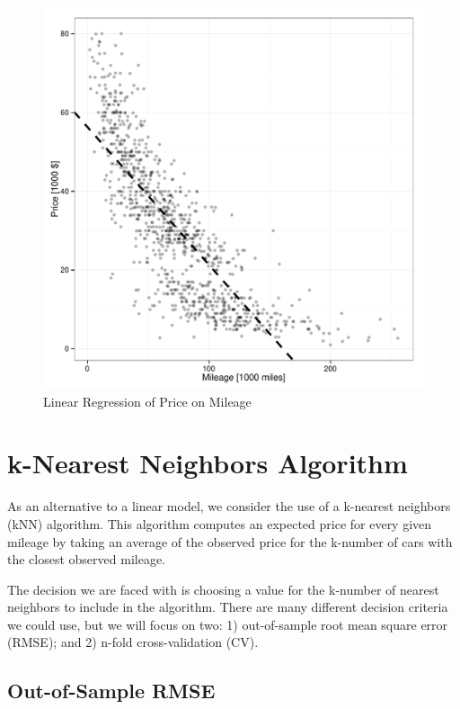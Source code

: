 \documentclass[11pt, fleqn]{article}
\begin{document}
\begin{figure}[!htb]
  \centering
  \includegraphics[scale=.5]{linear_fit.pdf}
  \caption{Linear Regression of Price on Mileage}
  \label{fig:linear}
\end{figure}

\section{k-Nearest Neighbors Algorithm}

As an alternative to a linear model, we consider the use of a k-nearest neighbors (kNN) algorithm. This algorithm computes an expected price for every given mileage by taking an average of the observed price for the k-number of cars with the closest observed mileage. 

The decision we are faced with is choosing a value for the k-number of nearest neighbors to include in the algorithm. There are many different decision criteria we could use, but we will focus on two: 1) out-of-sample root mean square error (RMSE); and 2) n-fold cross-validation (CV).

\subsection{Out-of-Sample RMSE}\label{sec:oos}
\end{document}
